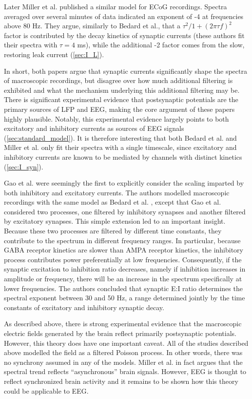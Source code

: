 Later Miller et al. \cite{Miller2009} published a similar model for ECoG recordings. Spectra averaged over several minutes of data indicated an exponent of -4 at frequencies above 80 Hz. They argue, similarly to Bedard et al., that a $\tau^2 / 1+ (2\pi\tau f)^2 $ factor is contributed by the decay kinetics of synaptic currents (these authors fit their spectra with $\tau=4$ \unit{\milli\second}), while the additional -2 factor comes from the slow, restoring leak current (\autoref{sec:I_L}).

In short, both papers argue that synaptic currents significantly shape the spectra of macroscopic recordings, but disagree over how much additional filtering is exhibited and what the mechanism underlying this additional filtering may be. There is significant experimental evidence that postsynaptic potentials are the primary sources of LFP and EEG, making the core argument of these papers highly plausible. Notably, this experimental evidence largely points to both excitatory and inhibitory currents as sources of EEG signals (\autoref{sec:standard_model}). It is therefore interesting that both Bedard et al. and Miller et al. only fit their spectra with a single timescale, since excitatory and inhibitory currents are known to be mediated by channels with distinct kinetics (\autoref{sec:I_syn}).

Gao et al. \cite{Gao2017} were seemingly the first to explicitly consider the scaling imparted by both inhibitory and excitatory currents. The authors modelled macroscopic recordings with the same model as Bedard et al. \cite{Bedard2006}, except that Gao et al. considered two processes, one filtered by inhibitory synapses and another filtered by excitatory synapses. This simple extension led to an important insight. Because these two processes are filtered by different time constants, they contribute to the spectrum in different frequency ranges. In particular, because GABA receptor kinetics are slower than AMPA receptor kinetics, the inhibitory process contributes power preferentially at low frequencies. Consequently, if the synaptic excitation to inhibition ratio decreases, namely if inhibition increases in amplitude or frequency, there will be an increase in the spectrum specifically at lower frequencies. The authors concluded that synaptic E:I ratio determines the spectral exponent between 30 and 50 Hz, a range determined jointly by the time constants of excitatory and inhibitory synaptic decay. 

As described above, there is strong experimental evidence that the macroscopic electric fields generated by the brain reflect primarily postsynaptic potentials. However, this theory does have one important caveat. All of the studies described above modelled the field as a filtered Poisson process. In other words, there was no synchrony assumed in any of the models. Miller et al.\cite{Miller2009} in fact argues that the spectral trend reflects ``asynchronous'' brain signals. However, EEG is thought to reflect synchronized brain activity and it remains to be shown how this theory could be applicable to EEG.


